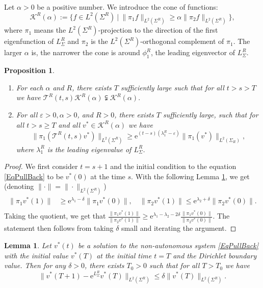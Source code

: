 \documentclass[12pt]{amsart}
\numberwithin{equation}{section}
\newtheorem{proposition}[theorem]{Proposition}
\newtheorem{lemma}[theorem]{Lemma}
\numberwithin{equation}{section}
\newcommand{\eps}{\varepsilon}
\newcommand{\dt}{\delta}
\newcommand{\al}{\alpha}
\newcommand{\cT}{\mathcal{T}}
\begin{document}
	Let $\alpha>0$ be a positive number. We introduce the cone of functions:
	$$\mathcal K^R(\alpha):=\{ f\in  L^{2}(\Sigma^R)\ |\ \|\pi_1 f\|_{L^{2}(\Sigma^R)}\geq \alpha\|\pi_2 f\|_{L^{2}(\Sigma^R)}\},$$
	where $\pi_1$ means the $L^2(\Sigma^R)$-projection to the direction of the first eigenfunction of $L^R_{\Sigma}$ and $\pi_2$ is the $L^2(\Sigma^R)$-orthogonal complement of $\pi_1$. The larger $\al$ is, the narrower the cone is around $\phi_1^R$, the leading eigenvector of $L_\Sigma^R$. 
	
	\begin{proposition}\label{PropCone}
		\begin{enumerate}
			\item For each $\alpha$ and $R$, there exists $T$ sufficiently large such that for all $t>s>T$ we have
			$\cT^R(t,s)\mathcal K^R(\alpha)\subsetneqq \mathcal K^R(\alpha).$
			\item  For all $\eps>0,\al>0$, and $R>0$, there exists $T$ sufficiently large,   such that for all  $t>s\geq T$ and all $v^*\in \mathcal K^R(\alpha)$ we have $$\|\pi_1 (\cT^R(t,s)v^*)\|_{L^2(\Sigma^R)}\geq \mathrm{e}^{(t-s)(\lambda^R_1-\eps)}\|\pi_1(v^*)\|_{L^2(\Sigma_R)},$$
			where $\lambda^R_1$ is the leading eigenvalue of $L_\Sigma^R$. 
		\end{enumerate}
	\end{proposition}
	\begin{proof}We first consider $t=s+1$ and the initial condition to the equation \eqref{EqPullBack} to be $v^*(0)$ at the time $s$.
		With the following Lemma \ref{LmApproximation}, we get (denoting $\|\cdot\|=\|\cdot\|_{L^2(\Sigma^R)} $)
		\begin{equation*}
			\begin{aligned}
				\|\pi_1v^*(1)\|&\geq \mathrm{e}^{\lambda_1-\dt}\|\pi_1v^*(0)\|,\quad \|\pi_2v^*(1)\|\leq \mathrm{e}^{\lambda_2+\dt}\|\pi_2v^*(0)\|.\\
			\end{aligned}
		\end{equation*}
		Taking the quotient, we get that $\frac{\|\pi_1v^*(1)\|}{\|\pi_2v^*(1)\|}\geq \mathrm{e}^{\lambda_1-\lambda_2-2\dt}\frac{\|\pi_1v^*(0)\|}{\|\pi_2v^*(0)\|}$. The statement then follows from taking $\dt$ small and iterating the argument. 
		
	\end{proof}
	
	\begin{lemma}\label{LmApproximation}
		Let $v^*(t)$ be a solution to the non-autonomous system \eqref{EqPullBack} with the initial value $v^*(T)$ at the initial time $t=T$ and the Dirichlet boundary value. Then for any $\dt>0$, there exists $T_0>0$ such that for all $T>T_0$  we have
		$$\|v^*(T+1)-\mathrm{e}^{L_\Sigma^R} v^*(T)\|_{L^2(\Sigma^R)}\leq \dt\|v^*(T)\|_{L^{2}(\Sigma^R)}.$$
		
	\end{lemma}
	
\end{document}
